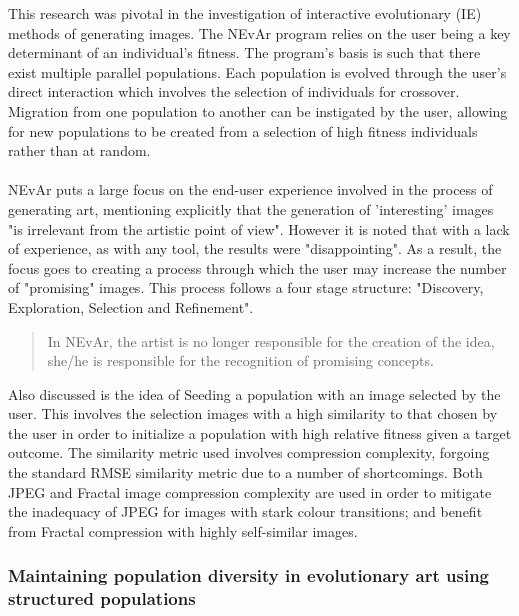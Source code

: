 \documentclass[10pt,a4paper]{article}
\begin{document}
	This research was pivotal in the investigation of interactive evolutionary (IE) methods of generating images.
	The NEvAr program relies on the user being a key determinant of an individual's fitness.
	The program's basis is such that there exist multiple parallel populations.
	Each population is evolved through the user's direct interaction which involves the selection of individuals for crossover.
	Migration from one population to another can be instigated by the user, allowing for new populations to be created from a selection of high fitness individuals rather than at random.
	\\\\
	NEvAr puts a large focus on the end-user experience involved in the process of generating art, mentioning explicitly that the generation of 'interesting' images "is irrelevant from the artistic point of view".
	However it is noted that with a lack of experience, as with any tool, the results were "disappointing".
	As a result, the focus goes to creating a process through which the user may increase the number of "promising" images.
	This process follows a four stage structure: "Discovery, Exploration, Selection and Refinement".
	\begin{quotation}
		In NEvAr, the artist is no longer responsible for the creation of the idea, she/he is responsible for the recognition of promising concepts.
	\end{quotation}
	
	Also discussed is the idea of Seeding a population with an image selected by the user.
	This involves the selection images with a high similarity to that chosen by the user in order to initialize a population with high relative fitness given a target outcome.
	The similarity metric used involves compression complexity, forgoing the standard RMSE similarity metric due to a number of shortcomings.
	Both JPEG and Fractal image compression complexity are used in order to mitigate the inadequacy of JPEG for images with stark colour transitions; and benefit from Fractal compression with highly self-similar images.
	
	\subsubsection{Maintaining population diversity in evolutionary art using structured populations \citep{distributed-evolutionary-art}}
	
\end{document}
